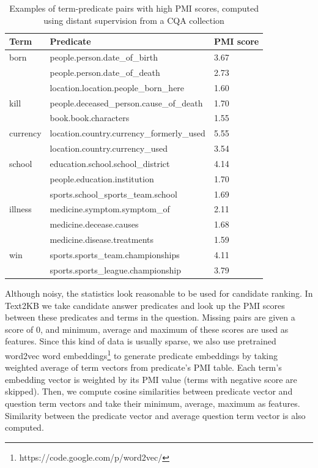 \begin{table}
\centering
\caption{Examples of term-predicate pairs with high PMI scores, computed using distant supervision from a CQA collection}
\label{table:text2kb:cqa_npmi}
\begin{tabular}{| p{2cm} | p{8cm} | p{2cm} |}
\hline
Term & Predicate & PMI score\\
\hline
born & people.person.date\_of\_birth & 3.67\\
 & people.person.date\_of\_death & 2.73\\
 & location.location.people\_born\_here & 1.60\\
\hline
kill & people.deceased\_person.cause\_of\_death & 1.70\\
& book.book.characters & 1.55\\
\hline
currency & location.country.currency\_formerly\_used & 5.55 \\
& location.country.currency\_used & 3.54 \\
\hline
school & education.school.school\_district & 4.14 \\
& people.education.institution & 1.70\\
& sports.school\_sports\_team.school & 1.69 \\
\hline
illness & medicine.symptom.symptom\_of & 2.11\\
& medicine.decease.causes & 1.68\\
& medicine.disease.treatments & 1.59\\
\hline
win & sports.sports\_team.championships & 4.11\\
& sports.sports\_league.championship & 3.79\\
\hline
\end{tabular}
\end{table}

Although noisy, the statistics look reasonable to be used for candidate ranking.
In Text2KB we take candidate answer predicates and look up the  PMI scores between these predicates and terms in the question.
Missing pairs are given a score of 0, and minimum, average and maximum of these scores are used as features.
Since this kind of data is usually sparse, we also use pretrained word2vec word embeddings\footnote{https://code.google.com/p/word2vec/} to generate predicate embeddings by taking weighted average of term vectors from predicate's PMI table.
Each term's embedding vector is weighted by its PMI value (terms with negative score are skipped).
Then, we compute cosine similarities between predicate vector and question term vectors and take their minimum, average, maximum as features.
Similarity between the predicate vector and average question term vector is also computed.


